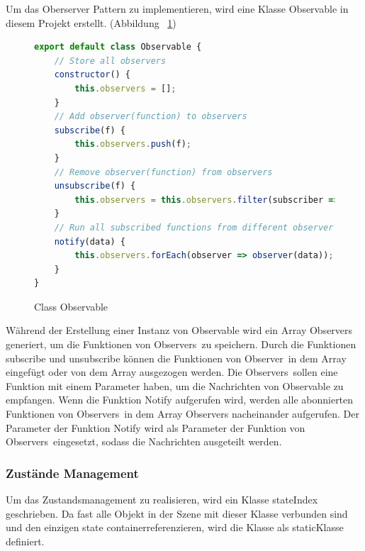   Um das Oberserver Pattern zu implementieren, wird eine Klasse {\selectfont Observable} in diesem Projekt erstellt. (Abbildung ~\ref{fig:observable})
  
\begin{figure}[ht]
\vspace*{1em}
\centering
\caption[Class Observable]{Class Observable}
\begin{lstlisting}[language=JavaScript, style=htmlcssjs]
export default class Observable {
    // Store all observers
    constructor() {
        this.observers = [];
    }
    // Add observer(function) to observers
    subscribe(f) {
        this.observers.push(f);
    }
    // Remove observer(function) from observers
    unsubscribe(f) {
        this.observers = this.observers.filter(subscriber => subscriber !== f);
    }
    // Run all subscribed functions from different observer
    notify(data) {
        this.observers.forEach(observer => observer(data));
    }
}
\end{lstlisting}
\label{fig:observable} 
\end{figure}
  Während der Erstellung einer Instanz von {\selectfont Observable} wird ein Array {\selectfont Observers} generiert, um die Funktionen von \glqq Observers\grqq\ zu speichern. Durch die Funktionen {\selectfont subscribe} und {\selectfont unsubscribe} können die Funktionen von \glqq Observer\grqq\ in dem Array eingefügt oder von dem Array ausgezogen werden. Die \glqq Observers\grqq\ sollen eine Funktion mit einem Parameter haben, um die Nachrichten von {\selectfont Observable} zu empfangen. Wenn die Funktion {\selectfont Notify} aufgerufen wird, werden alle abonnierten Funktionen von \glqq Observers\grqq\ in dem Array {\selectfont Observers} nacheinander aufgerufen. Der Parameter der Funktion {\selectfont Notify} wird als Parameter der Funktion von \glqq Observers\grqq\ eingesetzt, sodass die Nachrichten ausgeteilt werden.
  
  \subsubsection{Zustände Management}
  
  Um das Zustandsmanagement zu realisieren, wird ein Klasse {\selectfont stateIndex} geschrieben. Da fast alle Objekt in der Szene mit dieser Klasse verbunden sind und den einzigen \glqq state container\grqq referenzieren, wird die Klasse als \glqq static\grqq Klasse definiert.

